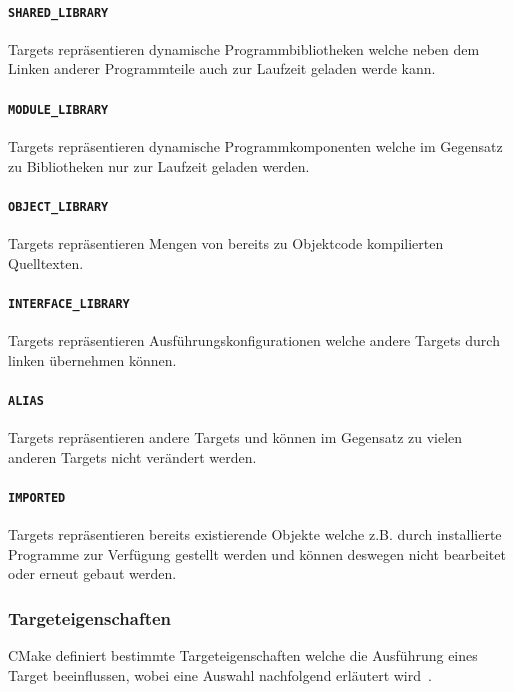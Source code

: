 \documentclass[german,proseminar,hyperref,utf8,lof]{zihpub}
\begin{document}
    \paragraph{\texttt{SHARED\_LIBRARY}} Targets repräsentieren dynamische Programmbibliotheken welche
    neben dem Linken anderer Programmteile auch zur Laufzeit geladen werde kann.

    \paragraph{\texttt{MODULE\_LIBRARY}} Targets repräsentieren dynamische Programmkomponenten welche
    im Gegensatz zu Bibliotheken nur zur Laufzeit geladen werden.

    \paragraph{\texttt{OBJECT\_LIBRARY}} Targets repräsentieren Mengen von bereits zu Objektcode
    kompilierten Quelltexten.

    \paragraph{\texttt{INTERFACE\_LIBRARY}} Targets repräsentieren Ausführungskonfigurationen welche andere
    Targets durch linken übernehmen können.

    \paragraph{\texttt{ALIAS}} Targets repräsentieren andere Targets und können im Gegensatz zu vielen
    anderen Targets nicht verändert werden.

    \paragraph{\texttt{IMPORTED}} Targets repräsentieren bereits existierende Objekte welche z.B. durch
    installierte Programme zur Verfügung gestellt werden und können deswegen nicht bearbeitet
    oder erneut gebaut werden.

    \subsubsection{Targeteigenschaften}
    CMake definiert bestimmte Targeteigenschaften welche die Ausführung eines Target beeinflussen,
    wobei eine Auswahl nachfolgend erläutert wird~.
\end{document}
